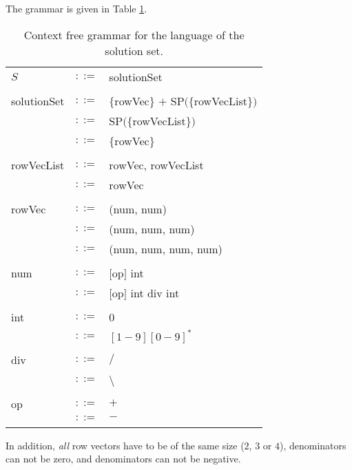 \documentclass{article}
\begin{document}
The grammar is given in Table \ref{Table_CFG_Of_Solution_Set}.
\begin{table}[h]
\centering
\begin{tabular}{ l c l }
  $S$              & $::=$ & solutionSet                               \\ \\
  solutionSet      & $::=$ & $\{$rowVec$\}$ $+$ SP$(\{$rowVecList$\})$ \\
                   & $::=$ &                    SP$(\{$rowVecList$\})$ \\
                   & $::=$ & $\{$rowVec$\}$                            \\ \\
  rowVecList       & $::=$ & rowVec, rowVecList                        \\
                   & $::=$ & rowVec                                    \\ \\
  rowVec           & $::=$ & (num, num)                                \\
                   & $::=$ & (num, num, num)                           \\
                   & $::=$ & (num, num, num, num)                      \\ \\
  num              & $::=$ & $[$op$]$ int                              \\
                   & $::=$ & $[$op$]$ int div int                      \\ \\
  int              & $::=$ & 0                                         \\
                   & $::=$ & $[1-9][0-9]^{*}$                          \\ \\
  div              & $::=$ & $/$                                       \\
                   & $::=$ & \textbackslash                            \\ \\
  op               & $::=$ & $+$                                       \\
                   & $::=$ & $-$                                       \\ \\
\end{tabular}
\caption{
Context free grammar for the language of the solution set.
\label{Table_CFG_Of_Solution_Set}}
\end{table}
In addition, \textit{all} row vectors have to be of the same size
($2$, $3$ or $4$), denominators can not be zero, and denominators can not be negative.
\end{document}
